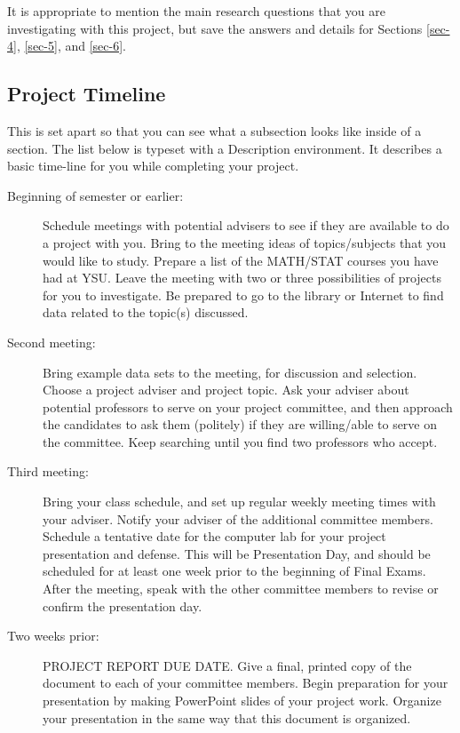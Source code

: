 \documentclass[11pt]{article}
\begin{document}
It is appropriate to mention the main research questions that you are
investigating with this project, but save the answers and details for
Sections \ref{sec-4}, \ref{sec-5}, and \ref{sec-6}.

\subsection[Project Timeline]{Project Timeline}
\label{sec-2-1}

This is set apart so that you can see what a subsection looks like
inside of a section. The list below is typeset with a Description
environment. It describes a basic time-line for you while completing
your project.

\begin{description}
\item[Beginning of semester or earlier:] Schedule meetings with
potential advisers to see if they are available to do a project
with you. Bring to the meeting ideas of topics/subjects that you
would like to study. Prepare a list of the MATH/STAT courses you
have had at YSU. Leave the meeting with two or three
possibilities of projects for you to investigate. Be prepared to
go to the library or Internet to find data related to the
topic(s) discussed.
\item[Second meeting:] Bring example data sets to the meeting, for
discussion and selection. Choose a project adviser and project
topic. Ask your adviser about potential professors to serve on
your project committee, and then approach the candidates to ask
them (politely) if they are willing/able to serve on the
committee. Keep searching until you find two professors who
accept.

\item[Third meeting:] Bring your class schedule, and set up regular
weekly meeting times with your adviser. Notify
your adviser of the additional committee
members. Schedule a tentative date for the
computer lab for your project presentation and
defense.  This will be Presentation Day, and
should be scheduled for at least one week prior to
the beginning of Final Exams. After the meeting,
speak with the other committee members to revise
or confirm the presentation day.
\item[Two weeks prior:] PROJECT REPORT DUE DATE. Give a final, printed
copy of the document to each of your committee members. Begin
preparation for your presentation by making PowerPoint slides of
your project work. Organize your presentation in the same way
that this document is organized.


\end{description}
\end{document}

